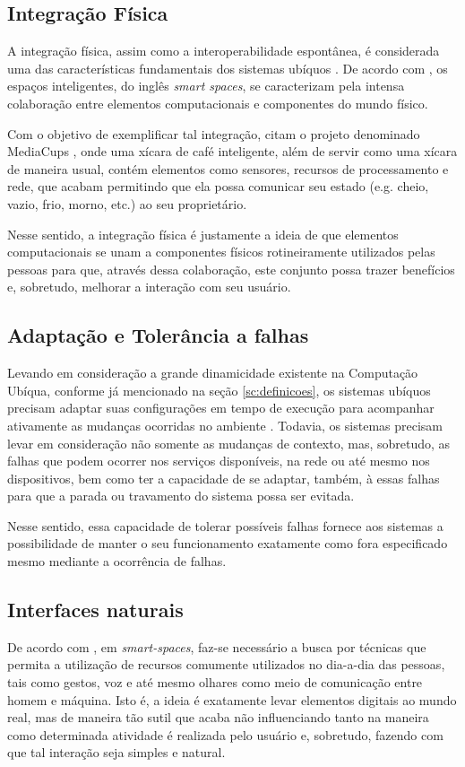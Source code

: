 \subsection{Integração Física}
A integração física, assim como a interoperabilidade espontânea, é considerada uma das características fundamentais dos sistemas ubíquos \citep{kindBerg2012}. De acordo com \cite{gomes2007}, os espaços inteligentes, do inglês \textit{smart spaces}, se caracterizam pela intensa colaboração entre elementos computacionais e componentes do mundo físico. 
	
Com o objetivo de exemplificar tal integração,  \cite{kindBerg2012} citam o projeto denominado MediaCups \citep{mediacups2001}, onde uma xícara de café inteligente, além de servir como uma xícara de maneira usual, contém elementos como sensores, recursos de processamento e rede, que acabam permitindo que ela possa comunicar seu estado (e.g. cheio, vazio, frio, morno, etc.) ao seu proprietário. 
	
Nesse sentido, a integração física é justamente a ideia de que elementos computacionais se unam a componentes físicos rotineiramente utilizados pelas pessoas para que, através dessa colaboração, este conjunto possa trazer benefícios e, sobretudo, melhorar a interação com seu usuário.

\subsection{Adaptação e Tolerância a falhas}
Levando em consideração a grande dinamicidade existente na Computação Ubíqua, conforme já mencionado na seção \ref{sc:definicoes}, os sistemas ubíquos precisam adaptar suas configurações em tempo de execução para acompanhar ativamente as mudanças ocorridas no ambiente \citep{lopes2011}. Todavia, os sistemas precisam levar em consideração não somente as mudanças de contexto, mas, sobretudo, as falhas que podem ocorrer nos serviços disponíveis, na rede ou até mesmo nos dispositivos, bem como ter a capacidade de se adaptar, também, à essas falhas para que a parada ou travamento do sistema possa ser evitada.

Nesse sentido, essa capacidade de tolerar possíveis falhas fornece aos sistemas a possibilidade de manter o seu funcionamento exatamente como fora especificado mesmo mediante a ocorrência de falhas.     

\subsection{Interfaces naturais}
De acordo com \cite{gomes2007}, em \textit{smart-spaces}, faz-se necessário a busca por técnicas que permita a utilização de recursos comumente utilizados no dia-a-dia das pessoas, tais como  gestos, voz e até mesmo olhares como meio de comunicação entre homem e  máquina. Isto é, a ideia é exatamente levar elementos digitais ao mundo real, mas de maneira tão sutil que acaba não influenciando tanto na maneira como determinada atividade é realizada pelo usuário e, sobretudo, fazendo com que tal interação seja simples e natural.

